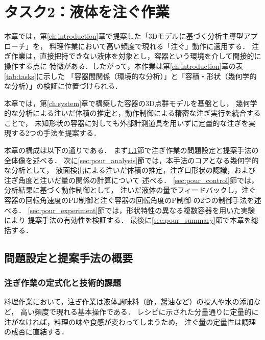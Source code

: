 \chapter{タスク2：液体を注ぐ作業}
\label{ch:pour}

本章では，第\ref{ch:introduction}章で提案した「3Dモデルに基づく分析主導型アプローチ」を，
料理作業において高い頻度で現れる「注ぐ」動作に適用する．
注ぎ作業は，直接把持できない液体を対象とし，容器という環境を介して間接的に操作する点に
特徴がある．したがって，本作業は第\ref{ch:introduction}章の表\ref{tab:tasks}に示した
「容器間関係（環境的な分析）」と「容積・形状（幾何学的な分析）」の検証に位置づけられる．

本章では，第\ref{ch:system}章で構築した容器の3D点群モデルを基盤とし，
幾何学的な分析による注いだ体積の推定と，動作制御による精密な注ぎ実行を統合することで，
未知形状の容器に対しても外部計測道具を用いずに定量的な注ぎを実現する2つの手法を提案する．

本章の構成は以下の通りである．
まず\ref{sec:pour_problem_overview}節で注ぎ作業の問題設定と提案手法の全体像を述べる．
次に\ref{sec:pour_analysis}節では，本手法のコアとなる幾何学的な分析として，
液面検出による注いだ体積の推定，注ぎ口形状の認識，および注ぎ角度と注いだ量の関係の計算について
述べる．
\ref{sec:pour_control}節では，分析結果に基づく動作制御として，
注いだ液体の量でフィードバックし，注ぐ容器の回転角速度のPD制御と注ぐ容器の回転角度のP制御
の2つの制御手法を述べる．
\ref{sec:pour_experiment}節では，形状特性の異なる複数容器を用いた実験により
提案手法の有効性を検証する．
最後に\ref{sec:pour_summary}節で本章を総括する．


\section{問題設定と提案手法の概要}
\label{sec:pour_problem_overview}

\subsection{注ぎ作業の定式化と技術的課題}

料理作業において，注ぎ作業は液体調味料（酢，醤油など）の投入や水の添加など，
高い頻度で現れる基本操作である．
レシピに示された分量通りに定量的に注がなければ，料理の味や食感が変わってしまうため，
注ぐ量の定量性は調理の成否に直結する．

